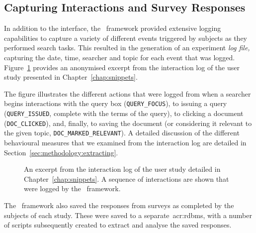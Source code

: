 \subsection{Capturing Interactions and Survey Responses}\label{sec:methodology:user:capturing}
In addition to the interface, the \treconomics~framework provided extensive logging capabilities to capture a variety of different events triggered by subjects as they performed search tasks. This resulted in the generation of an experiment \emph{log file,} capturing the date, time, searcher and topic for each event that was logged. Figure~\ref{fig:log} provides an anonymised excerpt from the interaction log of the user study presented in Chapter~\ref{chap:snippets}.

The figure illustrates the different actions that were logged from when a searcher begins interactions with the query box (\texttt{QUERY\_FOCUS}), to issuing a query (\texttt{QUERY\_ISSUED}, complete with the terms of the query), to clicking a document (\texttt{DOC\_CLICKED}), and, finally, to saving the document (or considering it relevant to the given topic, \texttt{DOC\_MARKED\_RELEVANT}). A detailed discussion of the different behavioural measures that we examined from the interaction log are detailed in Section~\ref{sec:methodology:extracting}.

\begin{figure}[t!]
    \centering
    \caption[Experiment log file excerpt]{An excerpt from the interaction log of the user study detailed in Chapter~\ref{chap:snippets}. A sequence of interactions are shown that were logged by the \treconomics~framework.}
    \label{fig:log}
\end{figure}

The \treconomics~framework also saved the responses from surveys as completed by the subjects of each study. These were saved to a separate~\gls{acr:rdbms}, with a number of scripts subsequently created to extract and analyse the saved responses.

